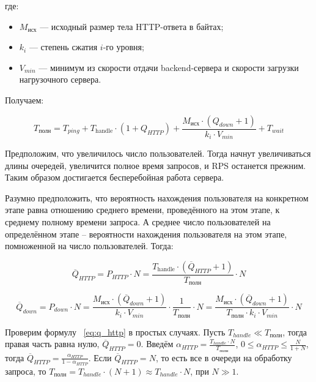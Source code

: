 \documentclass[12pt]{article}
\begin{document}
где:

\begin{itemize}
    \item $M_{\text{исх}}$ — исходный размер тела HTTP-ответа в байтах;
    \item $k_{i}$ — степень сжатия $i$-го уровня;
    \item $V_{min}$ — минимум из скорости отдачи backend-сервера и скорости загрузки нагрузочного сервера.
\end{itemize}

Получаем:

\begin{equation}
    T_{\text{полн}} = T_{ping} + T_{\text{handle}}\cdot(1 + Q_{HTTP}) + \frac{M_{\text{исх}} \cdot (Q_{down} + 1)}{k_{i} \cdot V_{min}} + T_{wait}
\end{equation}

Предположим, что увеличилось число пользователей. Тогда начнут увеличиваться длины очередей,
увеличится полное время запросов, и RPS останется прежним. Таким образом достигается бесперебойная работа сервера.

Разумно предположить, что вероятность нахождения пользователя на конкретном этапе
равна отношению среднего времени, проведённого на этом этапе, к среднему полному времени запроса. А среднее число пользователей
на определённом этапе -- вероятности нахождения пользователя на этом этапе, помноженной на число пользователей. Тогда:

\begin{equation}
    \overline{Q}_{HTTP} = P_{HTTP} \cdot N = \frac{T_{\text{handle}} \cdot (\overline{Q}_{HTTP} + 1)}{T_{\text{полн}}} \cdot N
    \label{eq:q_http}
\end{equation}

\begin{equation}
    \overline{Q}_{down} = P_{down} \cdot N = \frac{M_{\text{исх}}\cdot(\overline{Q}_{down} + 1)}{k_{i} \cdot V_{min}} \cdot \frac{1}{T_{\text{полн}}} \cdot N = \frac{M_{\text{исх}}\cdot(\overline{Q}_{down} + 1)}{T_{\text{полн}} \cdot k_{i} \cdot V_{min}} \cdot N
    \label{eq:q_down}
\end{equation}

\begin{spacing}{2.0}
    Проверим формулу ~\eqref{eq:q_http} в простых случаях. Пусть $T_{handle} \ll T_{\text{полн}}$, тогда правая часть равна нулю, $\overline{Q}_{HTTP} = 0$.
    Введём $\alpha_{HTTP} = \frac{T_{handle} \cdot N}{T_{\text{полн}}}$, $0 \le \alpha_{HTTP} \le \frac{N}{1+N}$, тогда $\overline{Q}_{HTTP} = \frac{\alpha_{HTTP}}{1 - \alpha_{HTTP}}$.
    Если $\overline{Q}_{HTTP} = N$, то есть все в очереди на обработку запроса,
    то $T_{\text{полн}} = T_{handle} \cdot (N+1) \approx T_{handle} \cdot N$, при $N \gg 1$.
\end{spacing}
\end{document}
